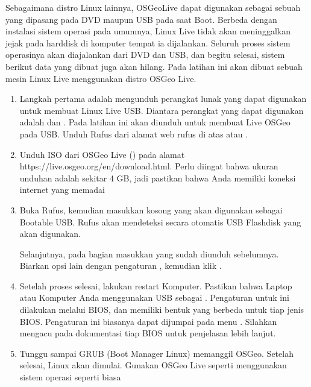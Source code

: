 \documentclass[letterpaper,10pt,english]{sphinxmanual}
\begin{document}
Sebagaimana distro Linux lainnya, OSGeoLive dapat digunakan sebagai sebuah  yang dipasang pada DVD maupun USB pada saat Boot. Berbeda dengan instalasi sistem operasi pada umumnya, Linux Live tidak akan meninggalkan jejak pada harddisk di komputer tempat ia dijalankan. Seluruh proses sistem operasinya akan diajalankan dari DVD dan USB, dan begitu selesai, sistem berikut data yang dibuat juga akan hilang. Pada latihan ini akan dibuat sebuah mesin Linux Live menggunakan distro OSGeo Live.
\begin{enumerate}
%
\item {} 
Langkah pertama adalah mengunduh perangkat lunak yang dapat digunakan untuk membuat Linux Live USB. Diantara perangkat yang dapat digunakan adalah  dan . Pada latihan ini akan diunduh  untuk membuat Live OSGeo pada USB. Unduh Rufus dari alamat web rufus di atas atau .

\item {} 
Unduh ISO dari OSGeo Live () pada alamat https://live.osgeo.org/en/download.html. Perlu diingat bahwa ukuran unduhan adalah sekitar 4 GB, jadi pastikan bahwa Anda memiliki koneksi internet yang memadai

\item {} 
Buka Rufus, kemudian masukkan  kosong yang akan digunakan sebagai Bootable USB. Rufus akan mendeteksi secara otomatis USB Flashdisk yang akan digunakan.

Selanjutnya, pada bagian  masukkan  yang sudah diunduh sebelumnya. Biarkan opsi lain dengan pengaturan , kemudian klik .


\item {} 
Setelah proses selesai, lakukan restart Komputer. Pastikan bahwa Laptop atau Komputer Anda menggunakan USB sebagai . Pengaturan untuk ini dilakukan melalui BIOS, dan memiliki bentuk yang berbeda untuk tiap jenis BIOS. Pengaturan ini biasanya dapat dijumpai pada menu . Silahkan mengacu pada dokumentasi tiap BIOS untuk penjelasan lebih lanjut.

\item {} 
Tunggu sampai GRUB (Boot Manager Linux) memanggil OSGeo. Setelah selesai, Linux akan dimulai. Gunakan OSGeo Live seperti menggunakan sistem operasi seperti biasa

\end{enumerate}
\end{document}
